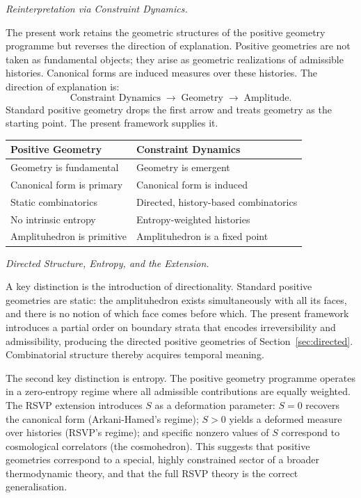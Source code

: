 \documentclass[11pt]{article}
\theoremstyle{plain}
\theoremstyle{definition}
\theoremstyle{remark}
\newcommand{\Sf}{S}
\begin{document}
\medskip\noindent\textit{Reinterpretation via Constraint Dynamics.}

The present work retains the geometric structures of the positive geometry programme but reverses the direction of explanation. Positive geometries are not taken as fundamental objects; they arise as geometric realizations of admissible histories. Canonical forms are induced measures over these histories. The direction of explanation is:
\[
  \text{Constraint Dynamics} \;\longrightarrow\; \text{Geometry} \;\longrightarrow\; \text{Amplitude}.
\]
Standard positive geometry drops the first arrow and treats geometry as the starting point. The present framework supplies it.

\begin{center}
\begin{tabular}{ll}
\toprule
Positive Geometry & Constraint Dynamics \\
\midrule
Geometry is fundamental & Geometry is emergent \\
Canonical form is primary & Canonical form is induced \\
Static combinatorics & Directed, history-based combinatorics \\
No intrinsic entropy & Entropy-weighted histories \\
Amplituhedron is primitive & Amplituhedron is a fixed point \\
\bottomrule
\end{tabular}
\end{center}

\medskip\noindent\textit{Directed Structure, Entropy, and the Extension.}

A key distinction is the introduction of directionality. Standard positive geometries are static: the amplituhedron exists simultaneously with all its faces, and there is no notion of which face comes before which. The present framework introduces a partial order on boundary strata that encodes irreversibility and admissibility, producing the directed positive geometries of Section~\ref{sec:directed}. Combinatorial structure thereby acquires temporal meaning.

The second key distinction is entropy. The positive geometry programme operates in a zero-entropy regime where all admissible contributions are equally weighted. The RSVP extension introduces $\Sf$ as a deformation parameter: $\Sf = 0$ recovers the canonical form (Arkani-Hamed's regime); $\Sf > 0$ yields a deformed measure over histories (RSVP's regime); and specific nonzero values of $\Sf$ correspond to cosmological correlators (the cosmohedron). This suggests that positive geometries correspond to a special, highly constrained sector of a broader thermodynamic theory, and that the full RSVP theory is the correct generalisation.
\end{document}
